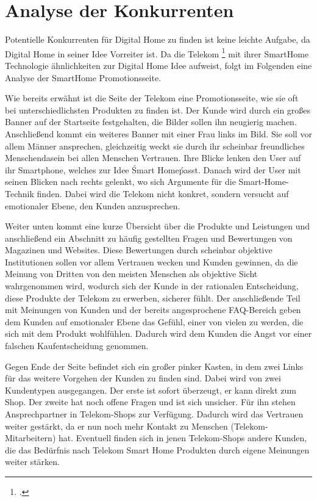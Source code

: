 \section{Analyse der Konkurrenten}
Potentielle Konkurrenten für Digital Home zu finden ist keine leichte Aufgabe, da Digital Home in seiner Idee Vorreiter ist. Da die Telekom \footcite[Website der Telekom:][]{Tkom} mit ihrer SmartHome Technologie ähnlichkeiten zur Digital Home Idee aufweist, folgt im Folgenden eine Analyse der SmartHome Promotionsseite.

Wie bereits erwähnt ist die Seite der Telekom eine Promotionsseite, wie sie oft bei unterschiedlichsten Produkten zu finden ist. Der Kunde wird durch ein großes Banner auf der Startseite festgehalten, die Bilder sollen ihn neugierig machen. Anschließend kommt ein weiteres Banner mit einer Frau links im Bild. Sie soll vor allem Männer ansprechen, gleichzeitig weckt sie durch ihr scheinbar freundliches Menschendasein bei allen Menschen Vertrauen. Ihre Blicke lenken den User auf ihr Smartphone, welches zur Idee \'Smart Home\' passt. Danach wird der User mit seinen Blicken nach rechts gelenkt, wo sich Argumente für die Smart-Home-Technik finden. Dabei wird die Telekom nicht konkret, sondern versucht auf emotionaler Ebene, den Kunden anzusprechen.

Weiter unten kommt eine kurze Übersicht über die Produkte und Leistungen und anschließend ein Abschnitt zu häufig gestellten Fragen und Bewertungen von Magazinen und Websites. Diese Bewertungen durch scheinbar objektive Institutionen sollen vor allem Vertrauen wecken und Kunden gewinnen, da die Meinung von Dritten von den meisten Menschen als objektive Sicht wahrgenommen wird, wodurch sich der Kunde in der rationalen Entscheidung, diese Produkte der Telekom zu erwerben, sicherer fühlt. Der anschließende Teil mit Meinungen von Kunden und der bereits angesprochene FAQ-Bereich geben dem Kunden auf emotionaler Ebene das Gefühl, einer von vielen zu werden, die sich mit dem Produkt wohlfühlen. Dadurch wird dem Kunden die Angst vor einer falschen Kaufentscheidung genommen.

Gegen Ende der Seite befindet sich ein großer pinker Kasten, in dem zwei Links für das weitere Vorgehen der Kunden zu finden sind. Dabei wird von zwei Kundentypen ausgegangen. Der erste ist sofort überzeugt, er kann direkt zum Shop. Der zweite hat noch offene Fragen und ist sich unsicher. Für ihn stehen Ansprechpartner in Telekom-Shops zur Verfügung. Dadurch wird das Vertrauen weiter gestärkt, da er nun noch mehr Kontakt zu Menschen (Telekom-Mitarbeitern) hat. Eventuell finden sich in jenen Telekom-Shops andere Kunden, die das Bedürfnis nach Telekom Smart Home Produkten durch eigene Meinungen weiter stärken.

